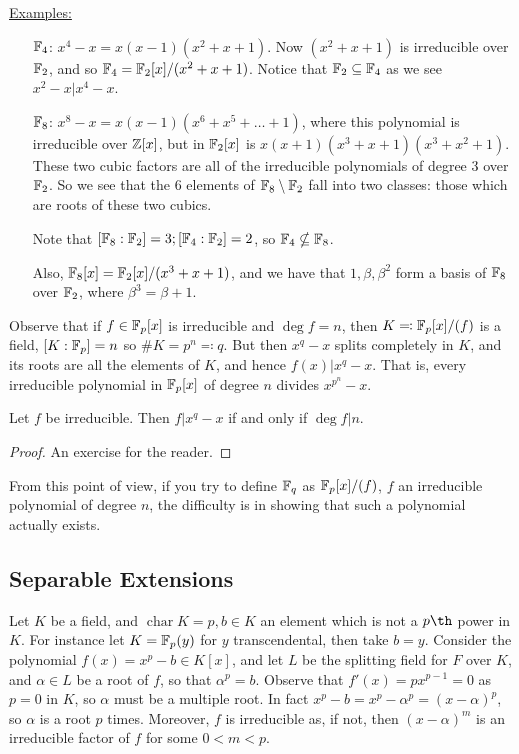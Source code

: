 \documentclass[a4paper, 10pt, twocolumn]{amsart}
\renewcommand{\charr}{\operatorname{char}}
\begin{document}
\underline{Examples:} 
\begin{itemize}
\item[$\mathbb{F}_4$:] $x^4-x = x(x-1)(x^2+x+1)$. Now $(x^2+x+1)$ is irreducible over $\mathbb{F}_2$, and so $\mathbb{F}_4 = \mathbb{F}_2[x] / (x^2+x+1)$. Notice that $\mathbb{F}_2 \subseteq \mathbb{F}_4$ as we see $x^2-x | x^4 - x$.
\item[$\mathbb{F}_8$:] $x^8-x = x(x-1)(x^6+x^5+\ldots + 1)$, where this polynomial is irreducible over $\mathbb{Z}[x]$, but in $\mathbb{F}_2[x]$ is $x(x+1)(x^3+x+1)(x^3+x^2+1)$. These two cubic factors are all of the irreducible polynomials of degree 3 over $\mathbb{F}_2$. So we see that the $6$ elements of $\mathbb{F}_8\setminus \mathbb{F}_2$ fall into two classes: those which are roots of these two cubics.

Note that $[\mathbb{F}_8:\mathbb{F}_2] = 3; [\mathbb{F}_4:\mathbb{F}_2] = 2$, so $\mathbb{F}_4 \nsubseteq \mathbb{F}_8$.

Also, $\mathbb{F}_8[x] = \mathbb{F}_2[x]/(x^3+ x+1)$, and we have that $1,\beta, \beta^2$ form a basis of $\mathbb{F}_8$ over $\mathbb{F}_2$, where $\beta^3 = \beta+1$.
\end{itemize}
Observe that if $f\in \mathbb{F}_p[x]$ is irreducible and $\deg f = n$, then $K \eqqcolon \mathbb{F}_p[x]/(f)$ is a field, $[K:\mathbb{F}_p] = n$ so $\#K = p^n \eqqcolon q$. But then $x^q - x$ splits completely in $K$, and its roots are all the elements of $K$, and hence $f(x)|x^q - x$. That is, every irreducible polynomial in $\mathbb{F}_p[x]$ of degree $n$ divides $x^{p^n} - x$.
\begin{proposition}
Let $f$ be irreducible. Then $f|x^q - x$ if and only if $\deg f | n$.
\end{proposition}
\begin{proof}
An exercise for the reader.
\end{proof}
From this point of view, if you try to define $\mathbb{F}_q$ as $\mathbb{F}_p[x]/(f)$, $f$ an irreducible polynomial of degree $n$, the difficulty is in showing that such a polynomial actually exists.

\subsection*{Separable Extensions}
Let $K$ be a field, and $\charr K = p, b\in K$ an element which is not a $p\th$ power in $K$. For instance let $K = \mathbb{F}_p(y)$ for $y$ transcendental, then take $b = y$. Consider the polynomial $f(x) = x^p-b \in K[x]$, and let $L$ be the splitting field for $F$ over $K$, and $\alpha \in L$ be a root of $f$, so that $\alpha^p = b$. Observe that $f'(x) = px^{p-1} = 0$ as $p=0$ in $K$, so $\alpha$ must be a multiple root. In fact $x^p-b = x^p - \alpha^p = (x-\alpha)^p$, so $\alpha$ is a root $p$ times. Moreover, $f$ is irreducible as, if not, then $(x-\alpha)^m$ is an irreducible factor of $f$ for some $0 < m < p$.
\end{document}
